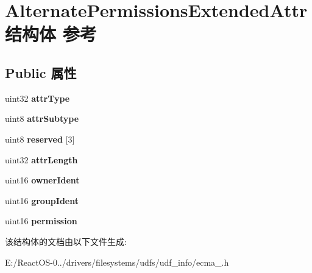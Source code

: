 \hypertarget{struct_alternate_permissions_extended_attr}{}\section{Alternate\+Permissions\+Extended\+Attr结构体 参考}
\label{struct_alternate_permissions_extended_attr}
\subsection*{Public 属性}
\begin{DoxyCompactItemize}
\item 
\mbox{\label{struct_alternate_permissions_extended_attr_acb8c8667de7bd7f7f158ffbc61d7f154}} 
uint32 {\bfseries attr\+Type}
\item 
\mbox{\label{struct_alternate_permissions_extended_attr_a4adecd8c6baee3aad202cbd6bd617b43}} 
uint8 {\bfseries attr\+Subtype}
\item 
\mbox{\label{struct_alternate_permissions_extended_attr_a27eb01124b78446137d2f7faaeba04e7}} 
uint8 {\bfseries reserved} \mbox{[}3\mbox{]}
\item 
\mbox{\label{struct_alternate_permissions_extended_attr_a60ba7b06ef612bd6ffa715d925813f63}} 
uint32 {\bfseries attr\+Length}
\item 
\mbox{\label{struct_alternate_permissions_extended_attr_af08c8f16c7daf974de42d100a15fdef5}} 
uint16 {\bfseries owner\+Ident}
\item 
\mbox{\label{struct_alternate_permissions_extended_attr_a7f922232aa47722ac81cc4633ba0702e}} 
uint16 {\bfseries group\+Ident}
\item 
\mbox{\label{struct_alternate_permissions_extended_attr_a87924d8ae48f3080b3c6418581982029}} 
uint16 {\bfseries permission}
\end{DoxyCompactItemize}


该结构体的文档由以下文件生成\+:\begin{DoxyCompactItemize}
\item 
E\+:/\+React\+O\+S-\/0../drivers/filesystems/udfs/udf\+\_\+info/ecma\+\_.\+h\end{DoxyCompactItemize}
